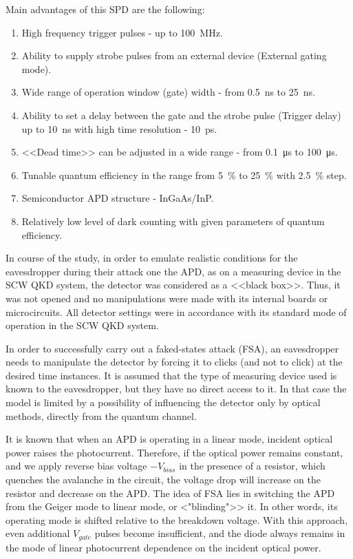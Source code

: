 Main advantages of this SPD are the following:
\begin{enumerate}
	\item High frequency trigger pulses - up to 100~MHz.
	\item Ability to supply strobe pulses from an external device (External gating mode).
	\item Wide range of operation window (gate) width - from 0.5~ns to 25~ns.
	\item Ability to set a delay between the gate and the strobe pulse (Trigger delay) up to 10~ns with high time resolution - 10~ps.
	\item <<Dead time>> can be adjusted in a wide range - from 0.1~μs to 100~μs.
	\item Tunable quantum efficiency in the range from 5~\% to 25~\% with 2.5~\% step.
	\item Semiconductor APD structure - InGaAs/InP.
	\item Relatively low level of dark counting with given parameters of quantum efficiency.
\end{enumerate}

In course of the study, in order to emulate realistic conditions for the eavesdropper during their attack one the APD, as on a measuring device in the SCW QKD system, the detector was considered as a <<black box>>. Thus, it was not opened and no manipulations were made with its internal boards or microcircuits. All detector settings were in accordance with its standard mode of operation in the SCW QKD system.

In order to successfully carry out a faked-states attack (FSA), an eavesdropper needs to manipulate the detector by forcing it to clicks (and not to click) at the desired time instances. It is assumed that the type of measuring device used is known to the eavesdropper, but they have no direct access to it. In that case the model is limited by a possibility of influencing the detector only by optical methods, directly from the quantum channel.

It is known that when an APD is operating in a linear mode, incident optical power raises the photocurrent. Therefore, if the optical power remains constant, and we apply reverse bias voltage $-V_{bias}$ in the presence of a resistor, which quenches the avalanche in the circuit, the voltage drop will increase on the resistor and decrease on the APD. The idea of FSA lies in switching the APD from the Geiger mode to linear mode, or <"blinding">> it. In other words, its operating mode is shifted relative to the breakdown voltage. With this approach, even additional $V_{gate}$ pulses become insufficient, and the diode always remains in the mode of linear photocurrent dependence on the incident optical power.  


